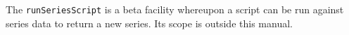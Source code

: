 The \verb+runSeriesScript+ is a beta facility whereupon a script can be run against series data to return
a new series. Its scope is outside this manual.
